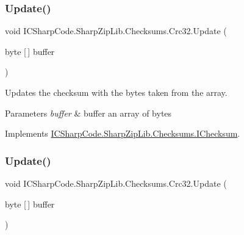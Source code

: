 \subsubsection{\texorpdfstring{Update()}{Update()}\hspace{0.1cm}{\footnotesize\ttfamily [3/6]}}
{\footnotesize\ttfamily void I\+C\+Sharp\+Code.\+Sharp\+Zip\+Lib.\+Checksums.\+Crc32.\+Update (\begin{DoxyParamCaption}\item[{byte \mbox{[}$\,$\mbox{]}}]{buffer }\end{DoxyParamCaption})\hspace{0.3cm}{\ttfamily [inline]}}



Updates the checksum with the bytes taken from the array. 


\begin{DoxyParams}{Parameters}
{\em buffer} & buffer an array of bytes \\
\hline
\end{DoxyParams}


Implements \hyperlink{interface_i_c_sharp_code_1_1_sharp_zip_lib_1_1_checksums_1_1_i_checksum_aee26d2b3705b22ab24cc9b5eb9dbc81d}{I\+C\+Sharp\+Code.\+Sharp\+Zip\+Lib.\+Checksums.\+I\+Checksum}.

\mbox{\label{class_i_c_sharp_code_1_1_sharp_zip_lib_1_1_checksums_1_1_crc32_aed937de570263627f41641aea63e399f}} 
\subsubsection{\texorpdfstring{Update()}{Update()}\hspace{0.1cm}{\footnotesize\ttfamily [4/6]}}
{\footnotesize\ttfamily void I\+C\+Sharp\+Code.\+Sharp\+Zip\+Lib.\+Checksums.\+Crc32.\+Update (\begin{DoxyParamCaption}\item[{byte \mbox{[}$\,$\mbox{]}}]{buffer }\end{DoxyParamCaption})\hspace{0.3cm}{\ttfamily [inline]}}



